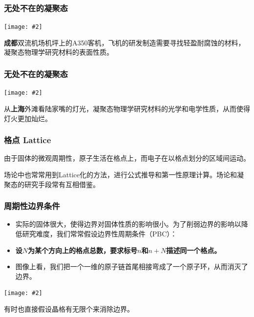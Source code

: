 \documentclass[CJK]{beamer}
\newcommand{\cpic}[2]{
\begin{center}
\texttt{[image: \#2]}
\end{center}
}
\begin{document}
\begin{frame}
\frametitle{\bch 无处不在的凝聚态 \ech}
\bch
\cpic{0.05}{chengdu}
{\bf 成都}双流机场机坪上的A350客机，飞机的研发制造需要寻找轻盈耐腐蚀的材料，凝聚态物理学研究材料的表面性质。
\ech
\end{frame}

\begin{frame}
\frametitle{\bch 无处不在的凝聚态 \ech}
\bch
\cpic{0.05}{shanghai}
从{\bf 上海}外滩看陆家嘴的灯光，凝聚态物理学研究材料的光学和电学性质，从而使得灯火更加灿烂。
\ech
\end{frame}


\begin{frame}
\frametitle{\bch 格点 Lattice \ech}
\bch
由于固体的微观周期性，原子生活在格点上，而电子在以格点划分的区域间运动。\par
场论中也常常用到Lattice化的方法，进行公式推导和第一性原理计算。场论和凝聚态的研究手段常有互相借鉴。
\ech
\end{frame}

\begin{frame}
\frametitle{\bch 周期性边界条件 \ech}
\bch
\begin{itemize}
\item 实际的固体很大，使得边界对固体性质的影响很小。为了削弱边界的影响以降低研究难度，我们常常假设边界性周期条件（PBC）：
\item {\bf 设$N$为某个方向上的格点总数，要求标号$n$和$n+N$描述同一个格点。}
\item 图像上看，我们把一个一维的原子链首尾相接弯成了一个原子环，从而消灭了边界。
\end{itemize}
\cpic{0.19}{pbc}
有时也直接假设晶格有无限个来消除边界。
\ech
\end{frame}
\end{document}
